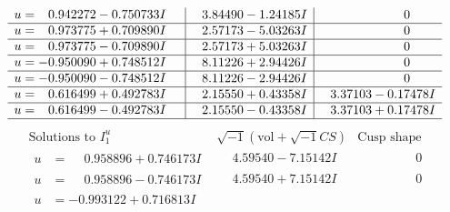 \documentclass[1p]{elsarticle_modified}
\theoremstyle{definition}
\newcommand{\I}{\sqrt{-1}}
\begin{document}
$$\begin{array}{c|c|c}
\begin{aligned}
u &= \phantom{-}0.942272 - 0.750733 I\end{aligned}
 & \phantom{-}3.84490 - 1.24185 I & \phantom{-0.000000 } 0 \\ \hline\begin{aligned}
u &= \phantom{-}0.973775 + 0.709890 I\end{aligned}
 & \phantom{-}2.57173 - 5.03263 I & \phantom{-0.000000 } 0 \\ \hline\begin{aligned}
u &= \phantom{-}0.973775 - 0.709890 I\end{aligned}
 & \phantom{-}2.57173 + 5.03263 I & \phantom{-0.000000 } 0 \\ \hline\begin{aligned}
u &= -0.950090 + 0.748512 I\end{aligned}
 & \phantom{-}8.11226 + 2.94426 I & \phantom{-0.000000 } 0 \\ \hline\begin{aligned}
u &= -0.950090 - 0.748512 I\end{aligned}
 & \phantom{-}8.11226 - 2.94426 I & \phantom{-0.000000 } 0 \\ \hline\begin{aligned}
u &= \phantom{-}0.616499 + 0.492783 I\end{aligned}
 & \phantom{-}2.15550 + 0.43358 I & \phantom{-}3.37103 - 0.17478 I \\ \hline\begin{aligned}
u &= \phantom{-}0.616499 - 0.492783 I\end{aligned}
 & \phantom{-}2.15550 - 0.43358 I & \phantom{-}3.37103 + 0.17478 I\\
 \hline 
 \end{array}$$\newpage$$\begin{array}{c|c|c}  
\text{Solutions to }I^u_{1}& \I (\text{vol} + \sqrt{-1}CS) & \text{Cusp shape}\\
 \hline 
\begin{aligned}
u &= \phantom{-}0.958896 + 0.746173 I\end{aligned}
 & \phantom{-}4.59540 - 7.15142 I & \phantom{-0.000000 } 0 \\ \hline\begin{aligned}
u &= \phantom{-}0.958896 - 0.746173 I\end{aligned}
 & \phantom{-}4.59540 + 7.15142 I & \phantom{-0.000000 } 0 \\ \hline\begin{aligned}
u &= -0.993122 + 0.716813 I\end{aligned}

\end{array}$$
\end{document}
